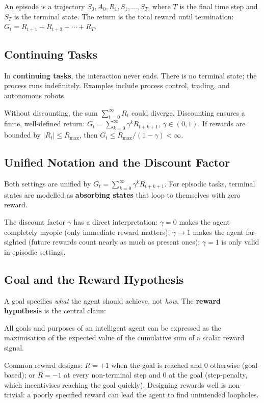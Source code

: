 \documentclass[11pt,a4paper]{article}
\newcommand{\term}[1]{\textcolor{DefGreen}{\textbf{#1}}}
\begin{document}
An episode is a trajectory $S_0, A_0, R_1, S_1, \ldots, S_T$, where $T$ is the final time step and $S_T$ is the terminal state. The return is the total reward until termination: $G_t = R_{t+1} + R_{t+2} + \cdots + R_T$.

\subsection{Continuing Tasks}

In \term{continuing tasks}, the interaction never ends. There is no terminal state; the process runs indefinitely. Examples include process control, trading, and autonomous robots.

Without discounting, the sum $\sum_{t=0}^\infty R_t$ could diverge. Discounting ensures a finite, well-defined return: $G_t = \sum_{k=0}^\infty \gamma^k R_{t+k+1}$, $\gamma \in (0,1)$. If rewards are bounded by $|R_t| \leq R_{\max}$, then $G_t \leq R_{\max}/(1-\gamma) < \infty$.

\subsection{Unified Notation and the Discount Factor}

Both settings are unified by $G_t = \sum_{k=0}^\infty \gamma^k R_{t+k+1}$. For episodic tasks, terminal states are modelled as \term{absorbing states} that loop to themselves with zero reward.

The discount factor $\gamma$ has a direct interpretation: $\gamma = 0$ makes the agent completely myopic (only immediate reward matters); $\gamma \to 1$ makes the agent far-sighted (future rewards count nearly as much as present ones); $\gamma = 1$ is only valid in episodic settings.

\subsection{Goal and the Reward Hypothesis}

A goal specifies \emph{what} the agent should achieve, not \emph{how}. The \term{reward hypothesis} is the central claim:

\begin{insightbox}
All goals and purposes of an intelligent agent can be expressed as the maximisation of the expected value of the cumulative sum of a scalar reward signal.
\end{insightbox}

Common reward designs: $R = +1$ when the goal is reached and $0$ otherwise (goal-based); or $R = -1$ at every non-terminal step and $0$ at the goal (step-penalty, which incentivises reaching the goal quickly). Designing rewards well is non-trivial: a poorly specified reward can lead the agent to find unintended loopholes.
\end{document}
